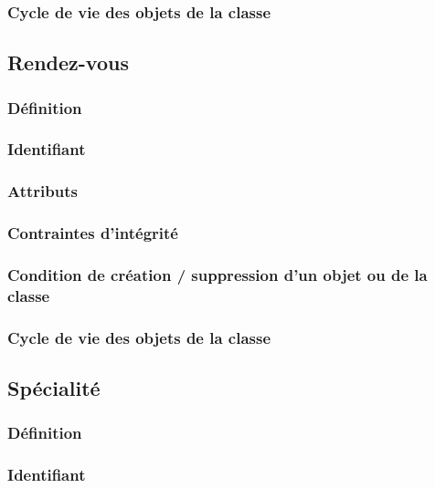 \documentclass[a4paper, 11pt]{report}
\begin{document}
\subsubsection{Cycle de vie des objets de la classe}

\subsection{Rendez-vous}

\subsubsection{Définition}

\subsubsection{Identifiant}

\subsubsection{Attributs}

\subsubsection{Contraintes d'intégrité}

\subsubsection{Condition de création / suppression d'un objet ou de la classe}

\subsubsection{Cycle de vie des objets de la classe}

\subsection{Spécialité}

\subsubsection{Définition}

\subsubsection{Identifiant}
\end{document}
